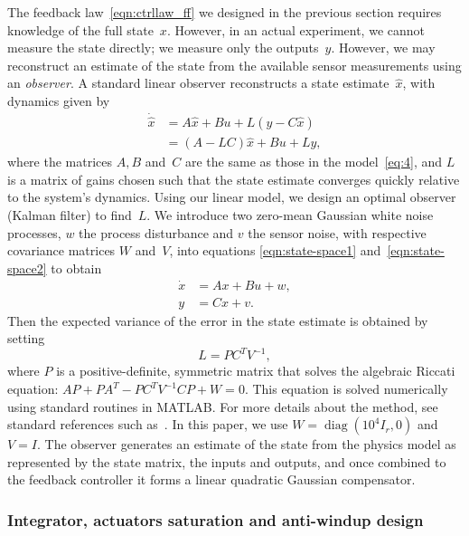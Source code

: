 \documentclass{iopart}
\begin{document}
The feedback law~\eqref{eqn:ctrllaw_ff} we designed in the previous section requires knowledge of the full state~$x$.  However, in an actual experiment, we cannot measure the state directly; we measure only the outputs~$y$.  However, we may reconstruct an estimate of the state from the available sensor measurements using an {\em observer}.
A standard linear observer reconstructs a state estimate~$\hat x$, with dynamics given by
\begin{equation}
	\begin{split}
		\dot{\hat{x}} &=  A \hat{x} + B u + L (y - C \hat{x}) \\
			&= (A- L C) \hat{x} + B u + L y,
		\label{obs}
	\end{split}
\end{equation}
where the matrices $A,B$ and~$C$ are the same as those in the model~\eqref{eq:4}, and $L$ is a matrix of gains chosen such that the state estimate converges quickly relative to the system's dynamics.
Using our linear model, we design an optimal observer (Kalman filter) to find~$L$.
We introduce two zero-mean Gaussian white noise processes, $w$ the process disturbance and $v$ the sensor noise, with respective covariance matrices $W$ and~$V$, into equations \eqref{eqn:state-space1} and~\eqref{eqn:state-space2} to obtain
\begin{align}
	\dot{x} &= A x + B u + w, \label{eqn:state-space-noise1} \\
	y &= C x + v. \label{eqn:state-space-noise2}
\end{align}
Then the expected variance of the error in the state estimate is obtained by setting
\begin{equation}
	L = P C^T V^{-1},
\end{equation}
where $P$ is a positive-definite, symmetric matrix that solves the algebraic Riccati equation: $A {P} + P {A}^T - P {C}^T V^{-1} C P + W = 0$.  This equation is solved numerically using standard routines in MATLAB. For more details about the method, see standard references such as~\cite{SandP, AandM}.
In this paper, we use $W= \operatorname{diag}(10^{4}I_r, 0)$ and $V= I$.
The observer generates an estimate of the state from the physics model as represented by the state matrix, the inputs and outputs, and once combined to the feedback controller it forms a linear quadratic Gaussian compensator.

\subsubsection{Integrator, actuators saturation and anti-windup design} 
\end{document}
